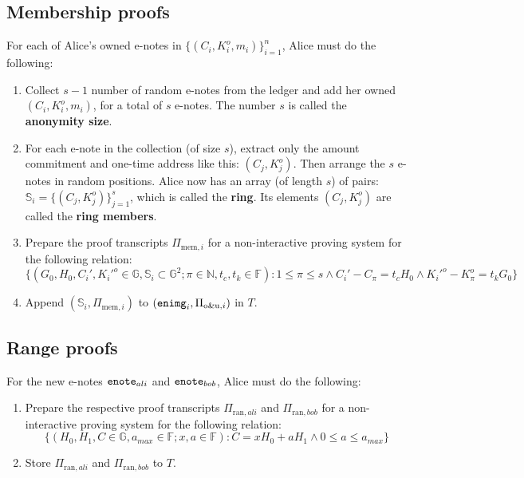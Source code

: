 \documentclass{article}
\begin{document}
\subsection{Membership proofs}
For each of Alice's owned e-notes in $\{(C_i,K_i^o,m_i)\}_{i=1}^n$, Alice must do the following:
\begin{enumerate}
    \item Collect $s-1$ number of random e-notes from the ledger and add her owned $(C_i,K_i^o,m_i)$, for a total of $s$ e-notes. The number $s$ is called the \textbf{anonymity size}.
    \item For each e-note in the collection (of size $s$), extract only the amount commitment and one-time address like this: $(C_j, K_j^o)$. Then arrange the $s$ e-notes in random positions. Alice now has an array (of length $s$) of pairs: $\mathbb{S}_i = \{(C_j, K_j^o)\}_{j=1}^s$, which is called the \textbf{ring}. Its elements $(C_j, K_j^o)$ are called the \textbf{ring members}. 
    \item Prepare the proof transcripts $\Pi_{\text{mem}, i}$ for a non-interactive proving system for the following relation:
$$\{(G_0, H_0, C_i', K_i'^o \in\mathbb{G}, \mathbb{S}_i\subset\mathbb{G}^2; \pi\in\mathbb{N}, t_c, t_k\in\mathbb{F}): 1\le\pi\le s \wedge C_i' - C_\pi = t_c H_0 \wedge K_i'^o - K_\pi^o = t_k G_0 \}$$
    \item Append $(\mathbb{S}_i, \Pi_{\text{mem}, i})$ to $({\tt enimg}_i, \Pi_{\text{o\&u}, i})$ in $T$.
\end{enumerate}

\subsection{Range proofs}
For the new e-notes ${\tt enote}_{ali}$ and ${\tt enote}_{bob}$, Alice must do the following:
\begin{enumerate}
    \item Prepare the respective proof transcripts $\Pi_{\text{ran}, ali}$ and $\Pi_{\text{ran}, bob}$ for a non-interactive proving system for the following relation:
$$\{(H_0, H_1, C \in\mathbb{G}, a_{max}\in\mathbb{F}; x, a\in\mathbb{F}): C = x H_0 + a H_1 \wedge 0\le a \le a_{max}\}$$
    \item Store $\Pi_{\text{ran}, ali}$ and $\Pi_{\text{ran}, bob}$ to $T$.
\end{enumerate}
\end{document}
